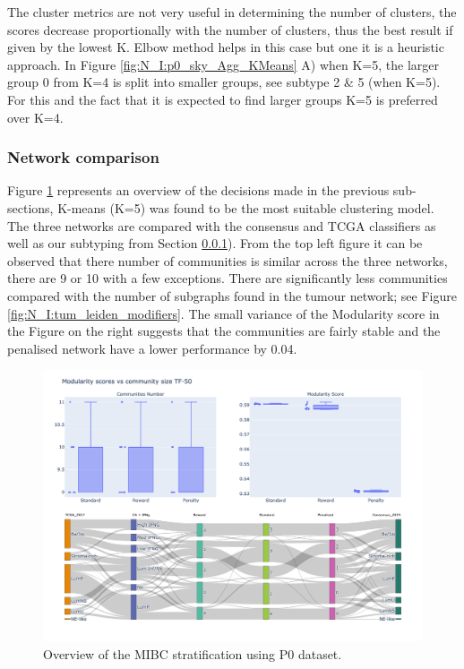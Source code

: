 The cluster metrics are not very useful in determining the number of clusters, the scores decrease proportionally with the number of clusters, thus the best result if given by the lowest K. Elbow method helps in this case but one it is a heuristic approach. In Figure \ref{fig:N_I:p0_sky_Agg_KMeans} A) when K=5, the larger group 0 from K=4 is split into smaller groups, see subtype 2 \& 5 (when K=5). For this and the fact that it is expected to find larger groups K=5 is preferred over K=4.


\subsubsection{Network comparison}


Figure \ref{fig:N_I:p0_sky_leiden} represents an overview of the decisions made in the previous sub-sections, K-means (K=5) was found to be the most suitable clustering model. The three networks are compared with the consensus and TCGA classifiers \citet{Kamoun2020-tj, Robertson2017-mg} as well as our subtyping from Section \ref{}). From the top left figure it can be observed that there number of communities is similar across the three networks, there are 9 or 10 with a few exceptions. There are significantly less communities compared with the number of subgraphs found in the tumour network; see Figure \ref{fig:N_I:tum_leiden_modifiers}. The small variance of the Modularity score in the Figure on the right suggests that the communities are fairly stable and the penalised network have a lower performance by 0.04.

\begin{figure}[!htb]    
    \centering
    \includegraphics[width=1.0\textwidth,height=0.7\textheight,keepaspectratio]{Sections/Network_I/Resources/P0/Ldn_Sky_TF_50_RawKMeans_K5.png}
    \caption{Overview of the MIBC stratification using P0 dataset.}
    \label{fig:N_I:p0_sky_leiden}
\end{figure}

